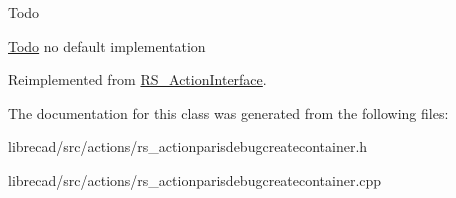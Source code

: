 \begin{DoxyRefDesc}{Todo}
\item[\hyperlink{todo__todo000006}{Todo}]no default implementation \end{DoxyRefDesc}


Reimplemented from \hyperlink{classRS__ActionInterface_af877a66b5b4a7053f2b1f0519c57a6f5}{R\-S\-\_\-\-Action\-Interface}.



The documentation for this class was generated from the following files\-:\begin{DoxyCompactItemize}
\item 
librecad/src/actions/rs\-\_\-actionparisdebugcreatecontainer.\-h\item 
librecad/src/actions/rs\-\_\-actionparisdebugcreatecontainer.\-cpp\end{DoxyCompactItemize}
